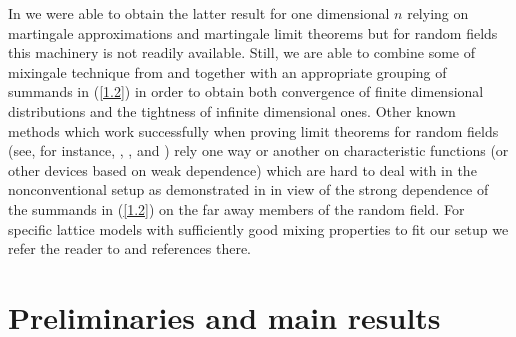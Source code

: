In \cite{KV} we were able to obtain the latter result for one dimensional $n$
relying on martingale approximations and martingale limit theorems but for 
random fields this machinery is not readily available. Still, we are able
to combine some of mixingale technique from \cite{ML1} and \cite{ML2} together 
with an appropriate grouping of summands in (\ref{1.2}) in order to obtain both 
convergence of finite dimensional distributions and the tightness of infinite 
dimensional ones.
Other known methods which work successfully when proving limit theorems for 
random fields (see, for instance, \cite{Bo}, \cite{BS}, \cite{BS2} and 
\cite{Su}  ) rely
one way or another on characteristic functions (or other devices based on
weak dependence) which are hard to deal with in the nonconventional setup 
as demonstrated in \cite{Ki} in view of the strong dependence of the summands
 in (\ref{1.2}) on the far away members of the random field. For specific
 lattice models with sufficiently good mixing properties to fit our setup
 we refer the reader to \cite{Al} and references there.
 
 
 \section{Preliminaries and main results}\label{sec2}\setcounter{equation}{0}

